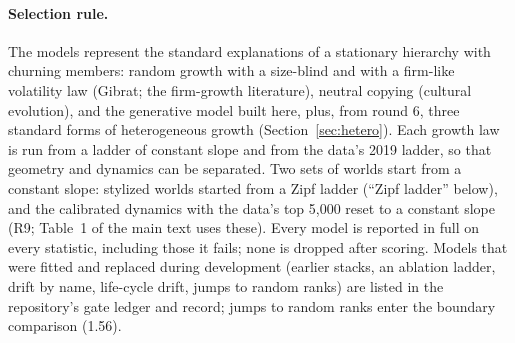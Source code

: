 \documentclass[10pt]{article}
\begin{document}
\paragraph{Selection rule.} The models represent the standard explanations of a stationary hierarchy with churning members: random growth with a size-blind and with a firm-like volatility law (Gibrat; the firm-growth literature), neutral copying (cultural evolution), and the generative model built here, plus, from round 6, three standard forms of heterogeneous growth (Section~\ref{sec:hetero}). Each growth law is run from a ladder of constant slope and from the data's 2019 ladder, so that geometry and dynamics can be separated. Two sets of worlds start from a constant slope: stylized worlds started from a Zipf ladder (``Zipf ladder'' below), and the calibrated dynamics with the data's top 5,000 reset to a constant slope (R9; Table~1 of the main text uses these). Every model is reported in full on every statistic, including those it fails; none is dropped after scoring. Models that were fitted and replaced during development (earlier stacks, an ablation ladder, drift by name, life-cycle drift, jumps to random ranks) are listed in the repository's gate ledger and record; jumps to random ranks enter the boundary comparison (1.56).

\begin{center}\small{}\end{center}
\end{document}
